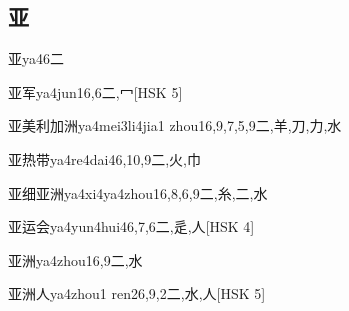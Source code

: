 \subsection*{亚}

\begin{EntryWithPhonetic}{亚}{ya4}{6}{⼆}
\end{EntryWithPhonetic}

\begin{EntryWithPhonetic}{亚军}{ya4jun1}{6,6}{⼆,⼍}[HSK 5]
\end{EntryWithPhonetic}

\begin{EntryWithPhonetic}{亚美利加洲}{ya4mei3li4jia1 zhou1}{6,9,7,5,9}{⼆,⽺,⼑,⼒,⽔}
\end{EntryWithPhonetic}

\begin{EntryWithPhonetic}{亚热带}{ya4re4dai4}{6,10,9}{⼆,⽕,⼱}
\end{EntryWithPhonetic}

\begin{EntryWithPhonetic}{亚细亚洲}{ya4xi4ya4zhou1}{6,8,6,9}{⼆,⽷,⼆,⽔}
\end{EntryWithPhonetic}

\begin{EntryWithPhonetic}{亚运会}{ya4yun4hui4}{6,7,6}{⼆,⾡,⼈}[HSK 4]
\end{EntryWithPhonetic}

\begin{EntryWithPhonetic}{亚洲}{ya4zhou1}{6,9}{⼆,⽔}
\end{EntryWithPhonetic}

\begin{EntryWithPhonetic}{亚洲人}{ya4zhou1 ren2}{6,9,2}{⼆,⽔,⼈}[HSK 5]
\end{EntryWithPhonetic}

